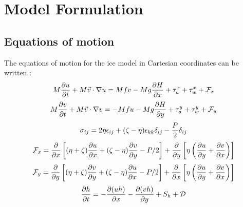 \chapter{Model Formulation}
\label{Phys}
\section {Equations of motion}
The equations of motion for the ice model in Cartesian coordinates can
be written \citep[from][]{Hibler79}:
\begin{equation}
  M {\partial u \over \partial t} + M \vec{v} \cdot \nabla u = Mfv
  - Mg {\partial H \over \partial x} + \tau_a^x + \tau_w^x + {\cal F}_x
\label{st1}
\end{equation}
\vspace{.2cm}
\begin{equation}
  M {\partial v \over \partial t} + M \vec{v} \cdot \nabla v = - Mfu
  - Mg {\partial H \over \partial y} + \tau_a^y + \tau_w^y + {\cal F}_y
\label{st2}
\end{equation}
\vspace{.2cm}
\begin{equation}
  \sigma_{ij} = 2 \eta \epsilon_{ij} + (\zeta - \eta) \epsilon_{kk}
  \delta_{ij} - {P \over 2} \delta_{ij}
\label{stress1}
\end{equation}
\vspace{.2cm}
\begin{equation}
   {\cal F}_x = {\partial \over \partial x} \left[ (\eta + \zeta)
   {\partial u \over \partial x} + (\zeta - \eta)
   {\partial v \over \partial y} - P/2 \right] +
   {\partial \over \partial y} \left[ \eta \left( 
   {\partial u \over \partial y} + {\partial v \over \partial x}
   \right) \right]
\label{fx1}
\end{equation}
\vspace{.2cm}
\begin{equation}
   {\cal F}_y = {\partial \over \partial y} \left[ (\eta + \zeta)
   {\partial v \over \partial y} + (\zeta - \eta)
   {\partial u \over \partial x} - P/2 \right] +
   {\partial \over \partial x} \left[ \eta \left( 
   {\partial u \over \partial y} + {\partial v \over \partial x}
   \right) \right]
\label{fy1}
\end{equation}
\vspace{.2cm}
\begin{equation}
  {\partial h \over \partial t} =
  - {\partial (uh) \over \partial x} - {\partial (vh) \over \partial y}
  + S_h + {\cal D}
\label{st3a}
\end{equation}
